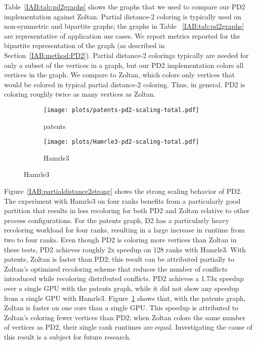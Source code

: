 Table~\ref{IAB:tab:pd2graphs} shows the graphs that we used to compare our PD2 implementation against Zoltan.
Partial distance-2 coloring is typically used on non-symmetric and bipartite graphs; the graphs in Table ~\ref{IAB:tab:pd2graphs} are representative of application use cases. 
We report metrics reported for the bipartite representation of the graph (as described in Section~\ref{IAB:method:PD2}).
Partial distance-2 colorings typically are needed for only a subset of the vertices in a graph, but 
our PD2 implementation colors all vertices in the graph. We compare to Zoltan, which colors only vertices that would be colored in typical partial distance-2 coloring. 
Thus, in general, PD2 is coloring roughly twice as many vertices as Zoltan.

\begin{figure}[h]
  \centering
  \caption{PD2 strong scaling for partial distance-2 coloring.}
  \label{IAB:partialdistance2strong}
  \begin{subfigure}[b]{0.25\textwidth}
    \centering
    \texttt{[image: plots/patents-pd2-scaling-total.pdf]}
    \caption{patents}
    \label{IAB:patentsstrong}
  \end{subfigure}%
  \begin{subfigure}[b]{0.22\textwidth}
    \centering
    \texttt{[image: plots/Hamrle3-pd2-scaling-total.pdf]}
    \caption{Hamrle3}
    \label{IAB:hamrle3strong}
  \end{subfigure}
\end{figure}

Figure~\ref{IAB:partialdistance2strong} shows the strong scaling behavior of PD2.
The experiment with Hamrle3 on four ranks benefits from a particularly good partition that results in less recoloring for both PD2 and Zoltan relative to other process configurations.
For the patents graph, D2 has a particularly heavy recoloring workload for four ranks, resulting in a large increase in runtime from two to four ranks.
Even though PD2 is coloring more vertices than Zoltan in these tests, PD2 achieves roughly 2x speedup on 128 ranks with Hamrle3.
With patents, Zoltan is faster than PD2;  this result can be attributed partially to Zoltan's optimized recoloring scheme that reduces the number of conflicts introduced while recoloring distributed conflicts.
PD2 achieves a 1.73x speedup over a single GPU with the patents graph, while it did not show any speedup from a single GPU with Hamrle3.
Figure~\ref{IAB:patentsstrong} shows that, with the patents graph, Zoltan is faster on one core than a single GPU.
This speedup is attributed to Zoltan's coloring fewer vertices than PD2;
when Zoltan colors the same number of vertices as PD2, their single rank runtimes are equal.
Investigating the cause of this result is a subject for future research.

